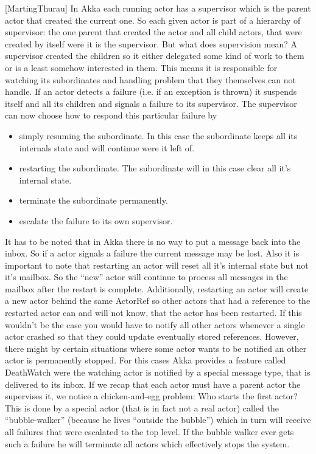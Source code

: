   [MartingThurau] In Akka each running actor has a supervisor which is the parent actor that created the current one. So each given actor is part of a hierarchy of supervisor: the one parent that created the actor and all child actors, that were created by itself were it is the supervisor. But what does supervision mean? A supervisor created the children so it either delegated some kind of work to them or is a least somehow interested in them. This means it is responsible for watching its subordinates and handling problem that they themselves can not handle.
  If an actor detects a failure (i.e. if an exception is thrown) it suspends itself and all its children and signals a failure to its supervisor. The supervisor can now choose how to respond this particular failure by
  \begin{itemize}
    \item simply resuming the subordinate. In this case the subordinate keeps all its internals state and will continue were it left of.
    \item restarting the subordinate. The subordinate will in this case clear all it’s internal state.
    \item terminate the subordinate permanently.
    \item escalate the failure to its own supervisor.
  \end{itemize}
  It has to be noted that in Akka there is no way to put a message back into the inbox. So if a actor signals a failure the current message may be lost. Also it is important to note that restarting an actor will reset all it’s internal state but not it’s mailbox. So the “new” actor will continue to process all messages in the mailbox after the restart is complete. Additionally, restarting an actor will create a new actor behind the same ActorRef so other actors that had a reference to the restarted actor can and will not know, that the actor has been restarted. If this wouldn’t be the case you would have to notify all other actors whenever a single actor crashed so that they could update eventually stored references.
  However, there might by certain situations where some actor wants to be notified an other actor is permanently stopped. For this cases Akka provides a feature called DeathWatch were the watching actor is notified by a special message type, that is delivered to its inbox.
  If we recap that each actor must have a parent actor the supervises it, we notice a chicken-and-egg problem: Who starts the first actor? This is done by a special actor (that is in fact not a real actor) called the “bubble-walker” (because he lives “outside the bubble”) which in turn will receive all failures that were escalated to the top level. If the bubble walker ever gets such a failure he will terminate all actors which effectively stops the system.

